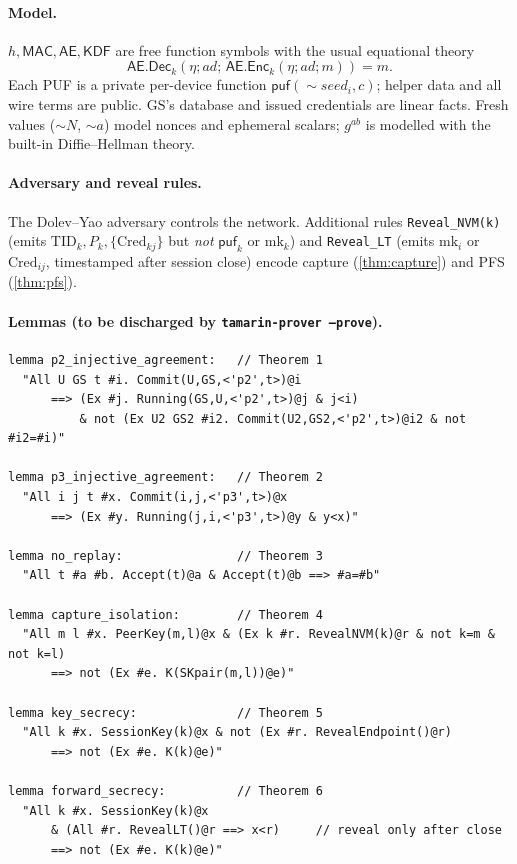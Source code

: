\documentclass[11pt]{article}
\theoremstyle{plain}
\theoremstyle{definition}
\newcommand{\GS}{\mathrm{GS}}
\newcommand{\TID}{\mathrm{TID}}
\newcommand{\Cred}{\mathrm{Cred}}
\newcommand{\mk}{\mathrm{mk}}
\newcommand{\MAC}{\mathsf{MAC}}
\newcommand{\aead}{\mathsf{AE}}
\newcommand{\Enc}{\mathsf{Enc}}
\newcommand{\Dec}{\mathsf{Dec}}
\newcommand{\KDF}{\mathsf{KDF}}
\begin{document}
\paragraph{Model.}
$h,\MAC,\aead,\KDF$ are free function symbols with the usual equational
theory
\[
\aead.\Dec_k(\eta;\mathit{ad};\,\aead.\Enc_k(\eta;\mathit{ad};m))=m.
\]
Each PUF is a private
per-device function $\mathsf{puf}(\sim\!\mathit{seed}_i,c)$; helper data and
all wire terms are public. $\GS$'s database and issued credentials are
linear facts. Fresh values ($\sim\!N$, $\sim\!a$) model nonces and ephemeral
scalars; $g^{ab}$ is modelled with the built-in Diffie--Hellman theory.

\paragraph{Adversary and reveal rules.}
The Dolev--Yao adversary controls the network. Additional rules
\texttt{Reveal\_NVM(k)} (emits $\TID_k,P_k,\{\Cred_{kj}\}$ but \emph{not}
$\mathsf{puf}_k$ or $\mk_k$) and \texttt{Reveal\_LT} (emits $\mk_i$ or
$\Cred_{ij}$, timestamped after session close) encode capture
(\cref{thm:capture}) and PFS (\cref{thm:pfs}).

\paragraph{Lemmas (to be discharged by \texttt{tamarin-prover --prove}).}
\begin{verbatim}
lemma p2_injective_agreement:   // Theorem 1
  "All U GS t #i. Commit(U,GS,<'p2',t>)@i
      ==> (Ex #j. Running(GS,U,<'p2',t>)@j & j<i)
          & not (Ex U2 GS2 #i2. Commit(U2,GS2,<'p2',t>)@i2 & not #i2=#i)"

lemma p3_injective_agreement:   // Theorem 2
  "All i j t #x. Commit(i,j,<'p3',t>)@x
      ==> (Ex #y. Running(j,i,<'p3',t>)@y & y<x)"

lemma no_replay:                // Theorem 3
  "All t #a #b. Accept(t)@a & Accept(t)@b ==> #a=#b"

lemma capture_isolation:        // Theorem 4
  "All m l #x. PeerKey(m,l)@x & (Ex k #r. RevealNVM(k)@r & not k=m & not k=l)
      ==> not (Ex #e. K(SKpair(m,l))@e)"

lemma key_secrecy:              // Theorem 5
  "All k #x. SessionKey(k)@x & not (Ex #r. RevealEndpoint()@r)
      ==> not (Ex #e. K(k)@e)"

lemma forward_secrecy:          // Theorem 6
  "All k #x. SessionKey(k)@x
      & (All #r. RevealLT()@r ==> x<r)     // reveal only after close
      ==> not (Ex #e. K(k)@e)"
\end{verbatim}
\end{document}
